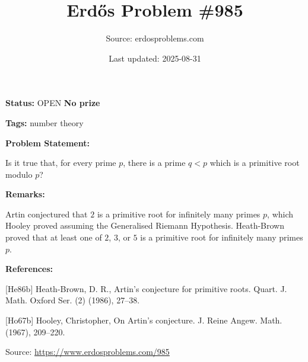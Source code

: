 \documentclass{article}
\title{Erd\H{o}s Problem \#985}
\date{Last updated: 2025-08-31}
\author{Source: erdosproblems.com}
\begin{document}
\maketitle

\noindent\textbf{Status:} OPEN \quad \textbf{No prize}

\noindent\textbf{Tags:} number theory

\medskip
\noindent\textbf{Problem Statement:}

Is it true that, for every prime $p$, there is a prime $q<p$ which is a primitive root modulo $p$?

\bigskip
\noindent\textbf{Remarks:}

Artin conjectured that $2$ is a primitive root for infinitely many primes $p$, which Hooley \cite{Ho67b} proved assuming the Generalised Riemann Hypothesis. Heath-Brown \cite{He86b} proved that at least one of $2$, $3$, or $5$ is a primitive root for infinitely many primes $p$.

\bigskip
\noindent\textbf{References:}

[He86b] Heath-Brown, D. R., Artin's conjecture for primitive roots. Quart. J. Math. Oxford Ser. (2) (1986), 27--38.
 
 [Ho67b] Hooley, Christopher, On {A}rtin's conjecture. J. Reine Angew. Math. (1967), 209--220.

\bigskip
\noindent\small{Source: \url{https://www.erdosproblems.com/985}}
\end{document}
